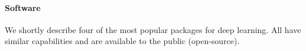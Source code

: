\begin{comment}
\begin{itemize}
	\item Using a convolutional network pretrained in natural images, such as the ImageNet database, CIFAR-10, CIFAR-100, etc., may not work for mammographic images because features useful for one kind of classification are not very useful for the other. Nonetheless, given that features become more specific at higher layers, we could discard the higher layers of the network and use only the cropped network~\cite{Karpathy2016}.
 
	\item Depending on the amount of data that we have we could: (1) add some fully connected layers on top of the pretrained network and train only these new layers, (2) add some convoutional and fully connected layers and train these new layers or (3) add convolutional and/or fully connected layers and train the entire network~\cite{Karpathy2016}.

	\item When training on a pretrained model or fine-tuning use an smaller learning rate than when training a network from scratch. Using a small learning rate assures that we do not disturb very much the already good network parameters.~\cite{Karpathy2016}.
\end{itemize}
\end{comment}

\paragraph{Software} We shortly describe four of the most popular packages for deep learning. All have similar capabilities and are available to the public (open-source).

